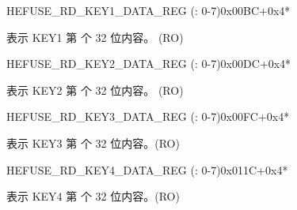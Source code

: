     \begin{register}{H}{EFUSE\_RD\_KEY1\_DATA\_REG (: 0-7)}{0x00BC+0x4*}\label{regdesc:EFUSERDKEY1DATANREG}
    \regnewline%
    \begin{regdesc}\begin{reglist}
    \label{fielddesc:EFUSEKEY1DATAN}\item [EFUSE\_KEY1\_DATA\regindex{n}] 表示 KEY1 第  个 32 位内容。 (RO)
    \end{reglist}\end{regdesc}
    \end{register}


    \begin{register}{H}{EFUSE\_RD\_KEY2\_DATA\_REG (: 0-7)}{0x00DC+0x4*}\label{regdesc:EFUSERDKEY2DATANREG}
    \regnewline%
    \begin{regdesc}\begin{reglist}
    \label{fielddesc:EFUSEKEY2DATAN}\item [EFUSE\_KEY2\_DATA\regindex{n}] 表示 KEY2 第  个 32 位内容。 (RO)
    \end{reglist}\end{regdesc}
    \end{register}


    \begin{register}{H}{EFUSE\_RD\_KEY3\_DATA\_REG (: 0-7)}{0x00FC+0x4*}\label{regdesc:EFUSERDKEY3DATANREG}
    \regnewline%
    \begin{regdesc}\begin{reglist}
    \label{fielddesc:EFUSEKEY3DATAN}\item [EFUSE\_KEY3\_DATA\regindex{n}] 表示 KEY3 第  个 32 位内容。(RO)
    \end{reglist}\end{regdesc}
    \end{register}


    \begin{register}{H}{EFUSE\_RD\_KEY4\_DATA\_REG (: 0-7)}{0x011C+0x4*}\label{regdesc:EFUSERDKEY4DATANREG}
    \regnewline%
    \begin{regdesc}\begin{reglist}
    \label{fielddesc:EFUSEKEY4DATAN}\item [EFUSE\_KEY4\_DATA\regindex{n}] 表示 KEY4 第  个 32 位内容。(RO)
    \end{reglist}\end{regdesc}
    \end{register}


